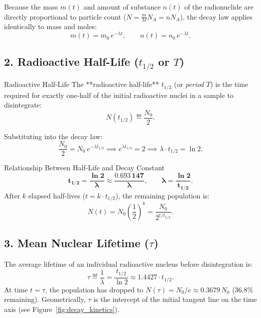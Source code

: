 Because the mass $m(t)$ and amount of substance $n(t)$ of the radionuclide are directly proportional to particle count ($N = \frac{m}{M} N_A = n N_A$), the decay law applies identically to mass and moles:
\begin{equation}
m(t) = m_0\,e^{-\lambda t}, \qquad n(t) = n_0\,e^{-\lambda t}.
\end{equation}

\subsection{2. Radioactive Half-Life ($t_{1/2}$ or $T$)}

\begin{definitionbox}{Radioactive Half-Life}
The **radioactive half-life** $t_{1/2}$ (or \emph{period} $T$) is the time required for exactly one-half of the initial radioactive nuclei in a sample to disintegrate:
\begin{equation}
N(t_{1/2}) \eqdef \frac{N_0}{2}.
\end{equation}
\end{definitionbox}

Substituting into the decay law:
\[
\frac{N_0}{2} = N_0\,e^{-\lambda t_{1/2}} \implies e^{\lambda t_{1/2}} = 2 \implies \lambda \cdot t_{1/2} = \ln 2.
\]

\begin{lawbox}{Relationship Between Half-Life and Decay Constant}
\begin{equation}
\mathbf{t_{1/2} = \frac{\ln 2}{\lambda} \approx \frac{0.693\,147}{\lambda}}, \qquad \mathbf{\lambda = \frac{\ln 2}{t_{1/2}}}.
\end{equation}
After $k$ elapsed half-lives ($t = k \cdot t_{1/2}$), the remaining population is:
\begin{equation}
N(t) = N_0 \left(\frac{1}{2}\right)^k = \frac{N_0}{2^{t / t_{1/2}}}.
\end{equation}
\end{lawbox}

\subsection{3. Mean Nuclear Lifetime ($\tau$)}
The average lifetime of an individual radioactive nucleus before disintegration is:
\begin{equation}
\tau \eqdef \frac{1}{\lambda} = \frac{t_{1/2}}{\ln 2} \approx 1.4427 \cdot t_{1/2}.
\end{equation}
At time $t = \tau$, the population has dropped to $N(\tau) = N_0 / e \approx 0.3679\,N_0$ ($36.8\%$ remaining). Geometrically, $\tau$ is the intercept of the initial tangent line on the time axis (see Figure~\ref{fig:decay_kinetics}).

